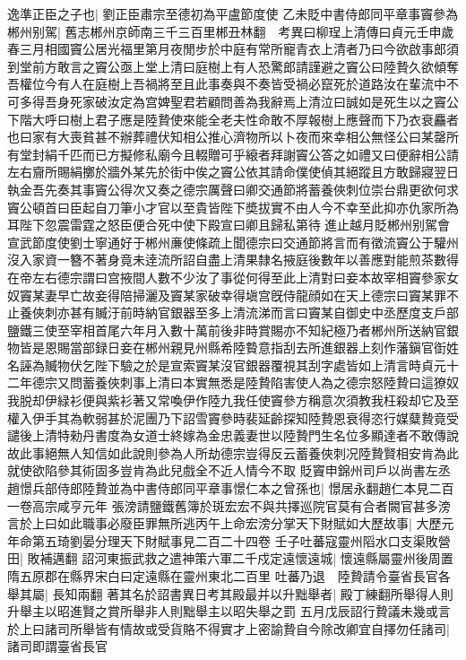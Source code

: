 逸準正臣之子也|{
	劉正臣肅宗至德初為平盧節度使}
乙未貶中書侍郎同平章事竇參為郴州别駕|{
	舊志郴州京師南三千三百里郴丑林翻　考異曰柳珵上清傳曰貞元壬申歲春三月相國竇公居光福里第月夜閒步於中庭有常所寵青衣上清者乃曰今欲啟事郎須到堂前方敢言之竇公亟上堂上清曰庭樹上有人恐驚郎請謹避之竇公曰陸贄久欲傾奪吾權位今有人在庭樹上吾禍將至且此事奏與不奏皆受禍必竄死於道路汝在輩流中不可多得吾身死家破汝定為宫婢聖君若顧問善為我辭焉上清泣曰誠如是死生以之竇公下階大呼曰樹上君子應是陸贄使來能全老夫性命敢不厚報樹上應聲而下乃衣衰麤者也曰家有大喪貧甚不辦葬禮伏知相公推心濟物所以卜夜而來幸相公無怪公曰某罄所有堂封絹千匹而已方擬修私廟今且輟贈可乎縗者拜謝竇公答之如禮又曰便辭相公請左右齎所賜絹擲於牆外某先於街中俟之竇公依其請命僕使偵其絕蹤且方敢歸寢翌日執金吾先奏其事竇公得次又奏之德宗厲聲曰卿交通節將蓄養俠刺位崇台鼎更欲何求竇公頓首曰臣起自刀筆小才官以至貴皆陛下奬拔實不由人今不幸至此抑亦仇家所為耳陛下忽震雷霆之怒臣便合死中使下殿宣曰卿且歸私第待進止越月貶郴州别駕會宣武節度使劉士寧通好于郴州亷使條疏上聞德宗曰交通節將言而有徵流竇公于驩州沒入家資一簪不著身竟未逹流所詔自盡上清果隸名掖庭後數年以善應對能煎茶數得在帝左右德宗謂曰宫掖間人數不少汝了事從何得至此上清對曰妾本故宰相竇參家女奴竇某妻早亡故妾得陪掃灑及竇某家破幸得塡宫旣侍龍顔如在天上德宗曰竇某罪不止養俠刺亦甚有贓汙前時納官銀器至多上清流涕而言曰竇某自御史中丞歷度支戶部鹽鐵三使至宰相首尾六年月入數十萬前後非時賞賜亦不知紀極乃者郴州所送納官銀物皆是恩賜當部録日妾在郴州親見州縣希陸䞇意指刮去所進銀器上刻作藩鎭官衘姓名誣為贓物伏乞陛下驗之於是宣索竇某沒官銀器覆視其刮字處皆如上清言時貞元十二年德宗又問蓄養俠刺事上清曰本實無悉是陸贄陷害使人為之德宗怒陸贄曰這獠奴我脱却伊緑衫便與紫衫著又常喚伊作陸九我任使竇參方稱意次須教我枉殺却它及至權入伊手其為軟弱甚於泥團乃下詔雪竇參時裴延齡探知陸贄恩衰得恣行媒糵贄竟受譴後上清特勑丹書度為女道士終嫁為金忠義妻世以陸贄門生名位多顯達者不敢傳說故此事絕無人知信如此說則參為人所劫德宗豈得反云蓄養俠刺况陸贄賢相安肯為此就使欲陷參其術固多豈肯為此兒戲全不近人情今不取}
貶竇申錦州司戶以尚書左丞趙憬兵部侍郎陸贄並為中書侍郎同平章事憬仁本之曾孫也|{
	憬居永翻趙仁本見二百一卷高宗咸亨元年}
張滂請鹽鐵舊簿於斑宏宏不與共擇巡院官莫有合者闕官甚多滂言於上曰如此職事必廢臣罪無所逃丙午上命宏滂分掌天下財賦如大歷故事|{
	大歷元年命第五琦劉晏分理天下財賦事見二百二十四卷}
壬子吐蕃寇靈州䧟水口支渠敗營田|{
	敗補邁翻}
詔河東振武救之遣神策六軍二千戍定遠懷遠城|{
	懷遠縣屬靈州後周置隋五原郡在縣界宋白曰定遠縣在靈州東北二百里}
吐蕃乃退　陸贄請令臺省長官各舉其屬|{
	長知兩翻}
著其名於詔書異日考其殿最并以升黜舉者|{
	殿丁練翻所舉得人則升舉主以昭進賢之賞所舉非人則黜舉主以昭失舉之罰}
五月戊辰詔行贄議未幾或言於上曰諸司所舉皆有情故或受貨賂不得實才上密諭贄自今除改卿宜自擇勿任諸司|{
	諸司即謂臺省長官}
